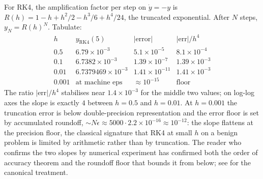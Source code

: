 \begin{exercise}
For RK4, the amplification factor per step on $\dot{y} = -y$ is
$R(h) = 1 - h + h^{2}/2 - h^{3}/6 + h^{4}/24$, the truncated
exponential. After $N$ steps, $y_{N} = R(h)^{N}$. Tabulate:
\[
\begin{array}{c|c|c|c}
h & y_{\text{RK4}}(5) & |\text{error}| & |\text{err}|/h^{4} \\\hline
0.5   & 6.79 \times 10^{-3}      & 5.1 \times 10^{-5}    & 8.1 \times 10^{-4} \\
0.1   & 6.7382 \times 10^{-3}    & 1.39 \times 10^{-7}   & 1.39 \times 10^{-3} \\
0.01  & 6.7379469 \times 10^{-3} & 1.41 \times 10^{-11}  & 1.41 \times 10^{-3} \\
0.001 & \text{at machine eps}    & \approx 10^{-15}      & \text{floor}
\end{array}
\]
The ratio $|\text{err}|/h^{4}$ stabilises near $1.4 \times
10^{-3}$ for the middle two values; on log-log axes the slope is
exactly $4$ between $h = 0.5$ and $h = 0.01$. At $h = 0.001$ the
truncation error is below double-precision representation and
the error floor is set by accumulated roundoff, $\sim N
\epsilon \approx 5000 \cdot 2.2 \times 10^{-16} \approx 10^{-12}$:
the slope flattens at the precision floor, the classical signature
that RK4 at small $h$ on a benign problem is limited by
arithmetic rather than by truncation. The reader who confirms the
two slopes by numerical experiment has confirmed both the order
of accuracy theorem and the roundoff floor that bounds it from
below; see \cite{text:v2ch07-hairer-norsett-wanner} for the
canonical treatment.
\end{exercise}

